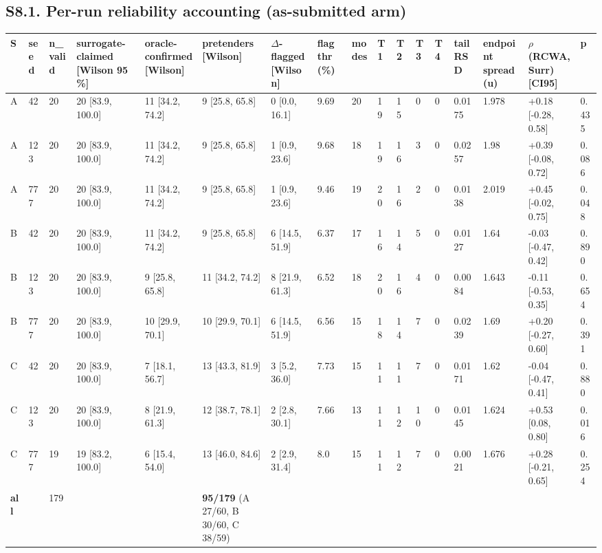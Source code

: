 \documentclass[11pt,a4paper]{article}
\newcounter{none}   %
\begin{document}
\subsection*{S8.1. Per-run reliability accounting (as-submitted arm)}

\begin{landscape}
\begingroup
\setlength{\tabcolsep}{2pt}\tiny
{}
\label{tab:8}
{\def\LTcaptype{none} %
\begin{longtable}[]{@{}lllllllllllllllll@{}}
\toprule\noalign{}
S & seed & n\_valid & surrogate-claimed {[}Wilson 95 \%{]} & oracle-confirmed {[}Wilson{]} & pretenders {[}Wilson{]} & \ensuremath{\Delta}-flagged {[}Wilson{]} & flag thr (\%) & modes & T1 & T2 & T3 & T4 & tail RSD & endpoint spread (u) & \ensuremath{\rho}(RCWA, Surr) {[}CI95{]} & p \\
\midrule\noalign{}
\endhead
\bottomrule\noalign{}
\endlastfoot
A & 42 & 20 & 20 {[}83.9, 100.0{]} & 11 {[}34.2, 74.2{]} & 9 {[}25.8, 65.8{]} & 0 {[}0.0, 16.1{]} & 9.69 & 20 & 19 & 15 & 0 & 0 & 0.0175 & 1.978 & +0.18 {[}-0.28, 0.58{]} & 0.435 \\
A & 123 & 20 & 20 {[}83.9, 100.0{]} & 11 {[}34.2, 74.2{]} & 9 {[}25.8, 65.8{]} & 1 {[}0.9, 23.6{]} & 9.68 & 18 & 19 & 16 & 3 & 0 & 0.0257 & 1.98 & +0.39 {[}-0.08, 0.72{]} & 0.086 \\
A & 777 & 20 & 20 {[}83.9, 100.0{]} & 11 {[}34.2, 74.2{]} & 9 {[}25.8, 65.8{]} & 1 {[}0.9, 23.6{]} & 9.46 & 19 & 20 & 16 & 2 & 0 & 0.0138 & 2.019 & +0.45 {[}-0.02, 0.75{]} & 0.048 \\
B & 42 & 20 & 20 {[}83.9, 100.0{]} & 11 {[}34.2, 74.2{]} & 9 {[}25.8, 65.8{]} & 6 {[}14.5, 51.9{]} & 6.37 & 17 & 16 & 14 & 5 & 0 & 0.0127 & 1.64 & -0.03 {[}-0.47, 0.42{]} & 0.890 \\
B & 123 & 20 & 20 {[}83.9, 100.0{]} & 9 {[}25.8, 65.8{]} & 11 {[}34.2, 74.2{]} & 8 {[}21.9, 61.3{]} & 6.52 & 18 & 20 & 16 & 4 & 0 & 0.0084 & 1.643 & -0.11 {[}-0.53, 0.35{]} & 0.654 \\
B & 777 & 20 & 20 {[}83.9, 100.0{]} & 10 {[}29.9, 70.1{]} & 10 {[}29.9, 70.1{]} & 6 {[}14.5, 51.9{]} & 6.56 & 15 & 18 & 14 & 7 & 0 & 0.0239 & 1.69 & +0.20 {[}-0.27, 0.60{]} & 0.391 \\
C & 42 & 20 & 20 {[}83.9, 100.0{]} & 7 {[}18.1, 56.7{]} & 13 {[}43.3, 81.9{]} & 3 {[}5.2, 36.0{]} & 7.73 & 15 & 11 & 11 & 7 & 0 & 0.0171 & 1.62 & -0.04 {[}-0.47, 0.41{]} & 0.880 \\
C & 123 & 20 & 20 {[}83.9, 100.0{]} & 8 {[}21.9, 61.3{]} & 12 {[}38.7, 78.1{]} & 2 {[}2.8, 30.1{]} & 7.66 & 13 & 11 & 12 & 10 & 0 & 0.0145 & 1.624 & +0.53 {[}0.08, 0.80{]} & 0.016 \\
C & 777 & 19 & 19 {[}83.2, 100.0{]} & 6 {[}15.4, 54.0{]} & 13 {[}46.0, 84.6{]} & 2 {[}2.9, 31.4{]} & 8.0 & 15 & 11 & 12 & 7 & 0 & 0.0021 & 1.676 & +0.28 {[}-0.21, 0.65{]} & 0.254 \\
\textbf{all} & & 179 & & & \textbf{95/179} (A 27/60, B 30/60, C 38/59) & & & & & & & & & & & \\
\end{longtable}
}
\endgroup
\end{landscape}
\end{document}
